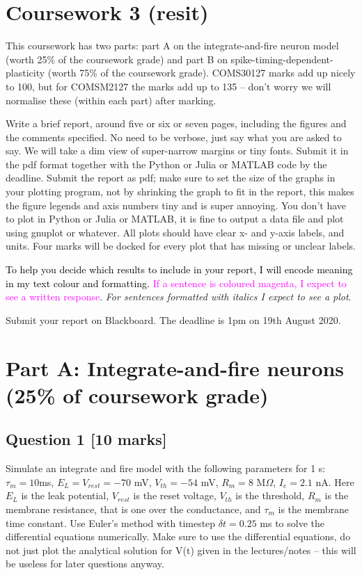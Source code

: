 \documentclass[12pt]{article}
\begin{document}
\section*{Coursework 3 (resit)}
This coursework has two parts: part A on the integrate-and-fire neuron model (worth 25\% of the coursework grade) and part B on spike-timing-dependent-plasticity (worth 75\% of the coursework grade). COMS30127 marks add up nicely to 100, but for COMSM2127 the marks add up to 135 -- don't worry we will normalise these (within each part) after marking.

Write a brief report, around five or six or seven pages,
including the figures and the comments specified. No need to be verbose, just say what you are asked to say. We will take a dim view of super-narrow margins or tiny fonts. Submit it in the pdf format
together with the Python or Julia or MATLAB code by the deadline. Submit the report as pdf; make
sure to set the size of the graphs in your plotting program, not by
shrinking the graph to fit in the report, this makes the figure
legends and axis numbers tiny and is super annoying. You don't have to
plot in Python or Julia or MATLAB, it is fine to output a data file and plot
using gnuplot or whatever. All plots should have clear x- and y-axis labels, and units. Four marks will be docked for every plot that has missing or unclear labels.

\textcolor{black}{To help you decide which results to include in your
report, I will encode meaning in my text colour and formatting. }\textcolor{magenta}{If
a sentence is coloured magenta, I expect to see a written response}.
\emph{For sentences formatted with italics I expect to see a plot}.

Submit your report on Blackboard. The deadline is 1pm on 19th August 2020.

\section*{Part A: Integrate-and-fire neurons (25\% of coursework grade)}

\subsection*{Question 1 [10 marks]}

Simulate an integrate and fire model with the following parameters for
1 s: $\tau_m = 10 $ms, $E_L = V_{rest} = -70$ mV, $V_{th} = -54$ mV, $R_m= 8$
M$\Omega$, $I_e = 2.1 $ nA. Here $E_L$ is the leak potential, $V_{rest}$ is the reset voltage,
$V_{th}$ is the threshold, $R_m$ is the membrane resistance, that is one
over the conductance, and $\tau_m$ is the membrane time constant. Use Euler's method with timestep $\delta t
= 0.25$ ms to solve the differential equations numerically. Make sure to use the differential equations, do not just plot the analytical solution for V(t) given in the lectures/notes -- this will be useless for later questions anyway.
\end{document}
